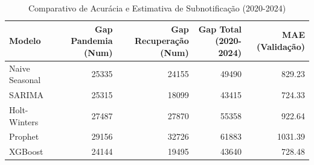 \begin{table}
\caption{Comparativo de Acurácia e Estimativa de Subnotificação (2020-2024)}
\label{tab:metricas_full}
\begin{tabular}{lrrrr}
\toprule
Modelo & Gap Pandemia (Num) & Gap Recuperação (Num) & Gap Total (2020-2024) & MAE (Validação) \\
\midrule
Naive Seasonal & 25335 & 24155 & 49490 & 829.23 \\
SARIMA & 25315 & 18099 & 43415 & 724.33 \\
Holt-Winters & 27487 & 27870 & 55358 & 922.64 \\
Prophet & 29156 & 32726 & 61883 & 1031.39 \\
XGBoost & 24144 & 19495 & 43640 & 728.48 \\
\bottomrule
\end{tabular}
\end{table}
